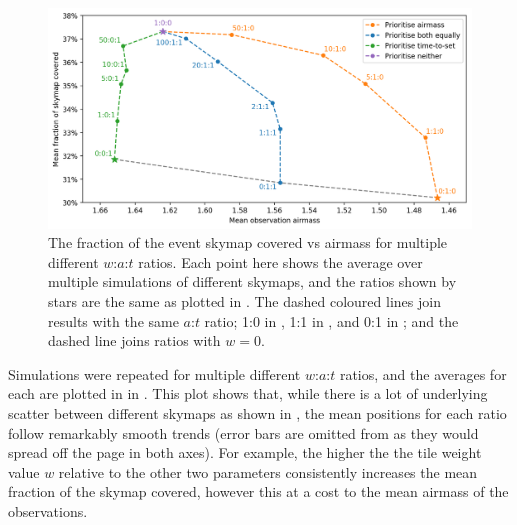 \begin{colsection}
\begin{figure}[t]
    \begin{center}
        \includegraphics[width=\linewidth]{images/sched_sim2.png}
    \end{center}
    \caption[Scheduler simulation results for different $w$:$a$:$t$ ratios]{
        The fraction of the event skymap covered vs airmass for multiple different $w$:$a$:$t$ ratios. Each point here shows the average over multiple simulations of different skymaps, and the ratios shown by stars are the same as plotted in . The dashed coloured lines join results with the same $a$:$t$ ratio; 1:0 in , 1:1 in , and 0:1 in ; and the  dashed line joins ratios with $w=0$.
    }\label{fig:scheduler_sim_results2}
\end{figure}

Simulations were repeated for multiple different $w$:$a$:$t$ ratios, and the averages for each are plotted in in . This plot shows that, while there is a lot of underlying scatter between different skymaps as shown in , the mean positions for each ratio follow remarkably smooth trends (error bars are omitted from  as they would spread off the page in both axes). For example, the higher the the tile weight value $w$ relative to the other two parameters consistently increases the mean fraction of the skymap covered, however this at a cost to the mean airmass of the observations.


\end{colsection}
